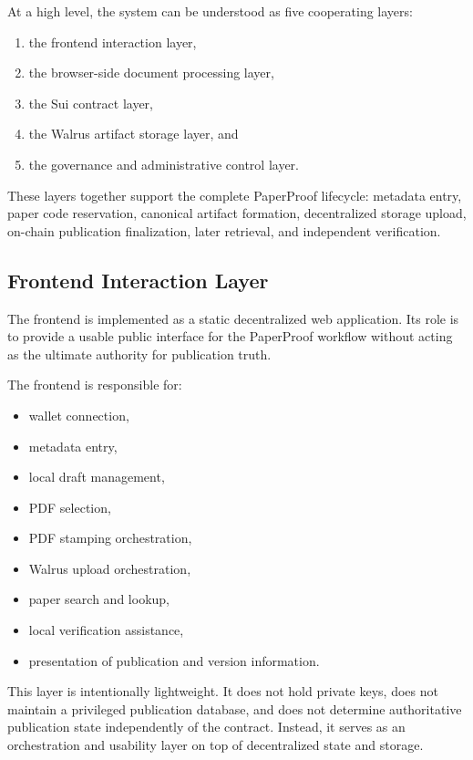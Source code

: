 \documentclass[journal]{IEEEtran}
\begin{document}
At a high level, the system can be understood as five cooperating layers:

\begin{enumerate}
    \item the frontend interaction layer,
    \item the browser-side document processing layer,
    \item the Sui contract layer,
    \item the Walrus artifact storage layer, and
    \item the governance and administrative control layer.
\end{enumerate}

These layers together support the complete PaperProof lifecycle: metadata entry, paper code reservation, canonical artifact formation, decentralized storage upload, on-chain publication finalization, later retrieval, and independent verification.

\subsection{Frontend Interaction Layer}

The frontend is implemented as a static decentralized web application. Its role is to provide a usable public interface for the PaperProof workflow without acting as the ultimate authority for publication truth.

The frontend is responsible for:
\begin{itemize}
    \item wallet connection,
    \item metadata entry,
    \item local draft management,
    \item PDF selection,
    \item PDF stamping orchestration,
    \item Walrus upload orchestration,
    \item paper search and lookup,
    \item local verification assistance,
    \item presentation of publication and version information.
\end{itemize}

This layer is intentionally lightweight. It does not hold private keys, does not maintain a privileged publication database, and does not determine authoritative publication state independently of the contract. Instead, it serves as an orchestration and usability layer on top of decentralized state and storage.
\end{document}

